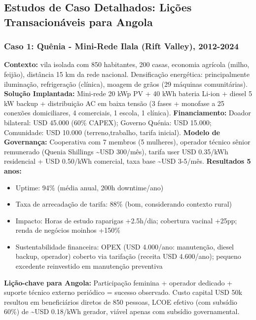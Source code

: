 \documentclass[12pt, a4paper]{article}
\begin{document}
\subsection{Estudos de Caso Detalhados: Lições Transacionáveis para Angola}

\subsubsection{Caso 1: Quênia - Mini-Rede Ilala (Rift Valley), 2012-2024}
\textbf{Contexto:} vila isolada com 850 habitantes, 200 casas, economia agrícola (milho, feijão), distância 15 km da rede nacional. Densificação energética: principalmente iluminação, refrigeração (clínica), moagem de grãos (29 máquinas comunitárias).
\textbf{Solução Implantada:} Mini-rede 20 kWp PV + 40 kWh bateria Li-ion + diesel 5 kW backup + distribuição AC em baixa tensão (3 fases + monofase a 25 conexões domiciliares, 4 comerciais, 1 escola, 1 clínica).
\textbf{Financiamento:} Doador bilateral: USD 45.000 (60\% CAPEX); Governo Quénia: USD 15.000; Comunidade: USD 10.000 (terreno,trabalho, tarifa inicial).
\textbf{Modelo de Governança:} Cooperativa com 7 membros (5 mulheres), operador técnico sênior remunerado (Quenia Shillings \textasciitilde{}USD 300/mês), tarifa user USD 0.35/kWh residencial + USD 0.50/kWh comercial, taxa base \textasciitilde{}USD 3-5/mês.
\textbf{Resultados 5 anos:}
\begin{itemize}
\item Uptime: 94\% (média anual, 200h downtime/ano)
\item Taxa de arrecadação de tarifa: 88\% (bom, considerando contexto rural)
\item Impacto: Horas de estudo raparigas +2.5h/dia; cobertura vacinal +25pp; renda de negócios moinhos +150\%
\item Sustentabilidade financeira: OPEX (USD 4.000/ano: manutenção, diesel backup, operador) coberto via tarifação (receita USD 4.600/ano); pequeno excedente reinvestido em manutenção preventiva
\end{itemize}\textbf{Lição-chave para Angola:} Participação feminina + operador dedicado + suporte técnico externo periódico = sucesso observado. Custo capital USD 50k resultou em beneficiários diretos de 850 pessoas, LCOE efetivo (com subsídio 60\%) de \textasciitilde{}USD 0.18/kWh gerador, viável apenas com subsídio governamental.
\end{document}
